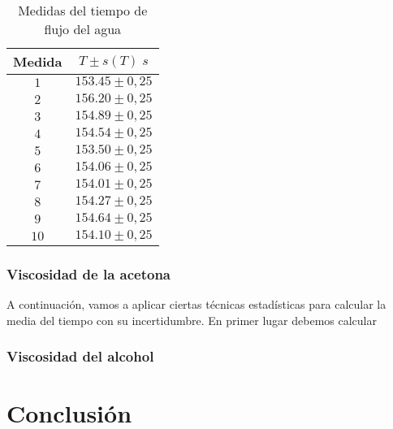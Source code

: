 \documentclass[a4paper,12pt,titlepage]{article}
\begin{document}
\begin{table}[h!]
    \centering
    \begin{tabular}{|c|c|}
    \hline
    Medida & $T \pm s(T) \; s$\\ \hline
    $1$    & $153.45\pm0,25$ \\ \hline
    $2$    & $156.20\pm0,25$ \\ \hline
    $3$    & $154.89\pm0,25$ \\ \hline
    $4$    & $154.54\pm0,25$ \\ \hline
    $5$    & $153.50\pm0,25$ \\ \hline
    $6$    & $154.06\pm0,25$ \\ \hline
    $7$    & $154.01\pm0,25$ \\ \hline
    $8$    & $154.27\pm0,25$ \\ \hline
    $9$    & $154.64\pm0,25$ \\ \hline
    $10$   & $154.10\pm0,25$ \\ \hline
    \end{tabular}
    \caption{Medidas del tiempo de flujo del agua}
    \label{Tiempos agua}
    \end{table}


\subsubsection{Viscosidad de la acetona}

A continuación, vamos a aplicar ciertas técnicas estadísticas para calcular la media del tiempo con su incertidumbre. En primer lugar debemos calcular 



\subsubsection{Viscosidad del alcohol}


\section{Conclusión}
\end{document}
